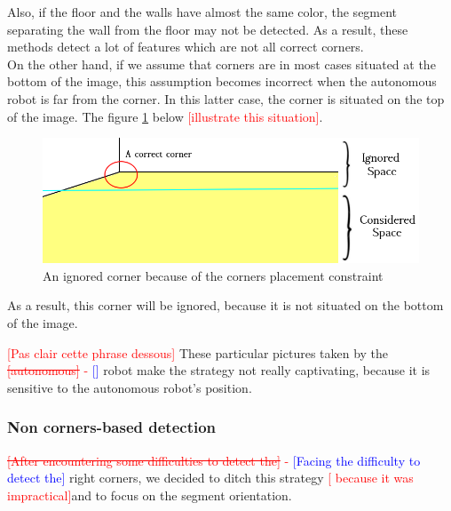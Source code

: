 \documentclass[12pt]{report}
\newcommand{\hcr}[2]{\textcolor{red}{\sout{[#1]} - \textcolor{blue}{ [#2]}}}
\newcommand{\hc}[1]{\textcolor{red}{[#1]}}
\begin{document}
	 Also, if the floor and the walls have almost the same color, the segment separating the wall from the floor may not be detected.
	 As a result, these methods detect a lot of features which are not all correct corners.\\	 
	 On the other hand, if we assume that corners are in most cases situated at the bottom of the image, this 
assumption becomes incorrect when the autonomous robot is far from the corner. In this latter case, the corner is 
situated on the top of the image. The figure \ref{fig:corner} below \hc{illustrate this situation}.
	 	\begin{figure}[h]
	 	\begin{center}
	 		\includegraphics[scale=0.6]{res/start1_c1.png}
	 		\caption{An ignored corner because of the corners placement constraint}
	 		\label{fig:corner}
	 	\end{center}
	 \end{figure}
	As a result, this corner will be ignored, because it is not situated on the bottom of the image.
	 
	\hc{Pas clair cette phrase dessous}
	 These particular pictures taken by the \hcr{autonomous}{} robot make the strategy not really captivating, 
because it is sensitive to the autonomous robot's position.
	 
	 \subsubsection{Non corners-based detection}
	
	 \hcr{After encountering some difficulties to detect the}{Facing the difficulty to detect the} right corners, 
we decided to ditch this strategy \hc{ because it was impractical}{and to focus on the segment orientation}. 
	 
\end{document}
